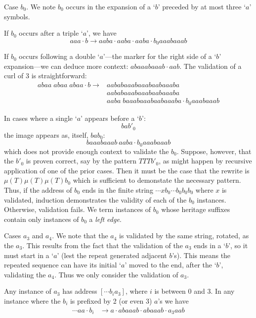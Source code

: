 \documentclass[11pt]{article}
\def\emph#1{{\em #1\/}}
\def\term#1{\emph{#1}}
\def\ni{\noindent}
\def\q#1{`$#1$'}
\def\addr#1{$[#1]$}
\begin{document}
\ni Case $b_0$. We note $b_0$ occurs in the expansion of a \q{b} preceded
by at most three \q{a} symbols.

\ni If $b_0$ occurs after a triple \q{a}, we have 
$$aaa\cdot b\rightarrow aaba\cdot aaba\cdot aaba\cdot b_0aaabaaab$$

\ni If $b_0$ occurs following a double \q{a}---the marker for the right side
of a \q{b} expansion---we can deduce more context: $abaaabaaab\cdot aab$.
The validation of a curl of 3 is straightforward:
\begin{align*}
abaa\;abaa\;abaa\cdot b\rightarrow&aababaaabaaabaabaaaba\\
&aababaaabaaabaabaaaba\\
&aaba\;baaabaaabaabaaaba\cdot b_0aaabaaab
\end{align*}

\ni In cases where a single \q{a} appears before a \q{b}:
$$bab'_0$$
\ni the image appears as, itself, $bab_0$:
$$baaabaaab~aaba\cdot b_0aaabaaab$$
\ni which does not provide enough context to validate the $b_0$.  Suppose, however, that the $b'_0$ is
proven correct, say by the pattern $TTTb'_0$, as might happen by recursive application of one
of the prior cases.  Then it must be the case that the rewrite is $\mu(T)\mu(T)\mu(T)b_0$ which is sufficient
to demonstate the necessary pattern.  Thus, if the address of $b_0$ ends in the finite string $\cdots xb_0\cdots b_0b_0b_0$ where $x$ is validated, induction demonstrates the validity of each of the $b_0$ instances.  Otherwise,
validation fails.  We term instances of $b_0$ whose heritage suffixes contain only instances of $b_0$ a
\term{left edge}.

Cases $a_3$ and $a_4$. We note that the $a_4$ is validated by the same string, rotated, as the $a_3$.
This results from the fact that the validation of the $a_3$ ends in a \q{b}, so
it must start in a \q{a} (lest the repeat generated adjacent $b$'s).  This means
the repeated sequence can have its initial \q{a} moved to the end, after the
\q{b}, validating the $a_4$.  Thus we only consider the validation of $a_3$.

Any instance of $a_3$ has address \addr{\cdots b_ia_3}, where $i$ is between 0 and 3.  In any instance
where the $b_i$ is prefixed by 2 (or even 3) $a$'s we have
\begin{align*}
 \cdots aa\cdot b_i&\rightarrow a\cdot abaaab\cdot abaaab\cdot a_3aab
\end{align*}
\end{document}
